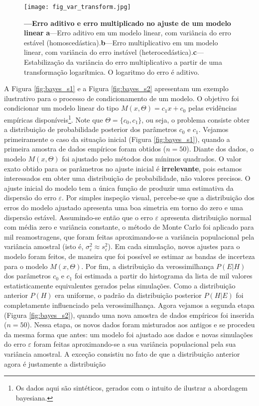 \documentclass[./main.tex]{subfiles}
\begin{document}
\begin{figure}[t!] %
	\centering				
	\texttt{[image: fig\_var\_transform.jpg]}		
	\caption[Erro aditivo e erro multiplicativo]
	{\textbf{---\;Erro aditivo e erro multiplicado no ajuste de um modelo linear}
        \;\textbf{a}\;---\;Erro aditivo em um modelo linear, com variância do erro estável (homoscedástica).\;\textbf{b}\;---\;Erro multiplicativo em um modelo linear, com variância do erro instável (heterocedástica).\;\textbf{c}\;---\;Estabilização da variância do erro multiplicativo a partir de uma transformação logarítmica. O logaritmo do erro é aditivo.
	}
\label{fig:var_transform}  %
\end{figure}
\par A Figura \ref{fig:bayes_s1} e a Figura \ref{fig:bayes_s2} apresentam um exemplo ilustrativo para o processo de condicionamento de um modelo. O objetivo foi condicionar um modelo linear do tipo $M(x, \Theta) = c_{1}x + c_{0}$ pelas evidências empíricas disponíveis\footnote{Os dados aqui são sintéticos, gerados com o intuito de ilustrar a abordagem bayesiana.}. Note que $\Theta=\{c_{0}, c_{1}\}$, ou seja, o problema consiste obter a distribuição de probabilidade posterior dos parâmetros $c_0$ e $c_1$. Vejamos primeiramente o caso da situação inicial (Figura \ref{fig:bayes_s1}), quando a primeira amostra de dados empíricos foram obtidos ($n=50$). Diante dos dados, o modelo $M(x, \Theta)$ foi ajustado pelo métodos dos mínimos quadrados. O valor exato obtido para os parâmetros no ajuste inicial é \textbf{irrelevante}, pois estamos interessados em obter uma distribuição de probabilidade, não valores precisos. O ajuste inicial do modelo tem a única função de produzir uma estimativa da dispersão do erro $\varepsilon$. Por simples inspeção visual, percebe-se que a distribuição dos erros do modelo ajustado apresenta uma boa simetria em torno do zero e uma dispersão estável. Assumindo-se então que o erro $\varepsilon$ apresenta distribuição normal com média zero e variância constante, o método de Monte Carlo foi aplicado para mil reamostragens, que foram feitas aproximando-se a variância populacional pela variância amostral (isto é, $\sigma^2_\varepsilon \approx s^2_\varepsilon$). Em cada simulação, novos ajustes para o modelo foram feitos, de maneira que foi possível se estimar as bandas de incerteza para o modelo $M(x, \Theta)$.  Por fim, a distribuição da verossimilhança $P(E | H)$ dos parâmetros $c_0$ e $c_1$ foi estimada a partir do histograma da lista de mil valores estatisticamente equivalentes gerados pelas simulações. Como a distribuição anterior $P(H)$ era uniforme, o padrão da distribuição posterior $P(H | E)$ foi completamente influenciado pela verossimilhança. Agora vejamos a segunda etapa (Figura \ref{fig:bayes_s2}), quando uma nova amostra de dados empíricos foi inserida ($n=50$). Nessa etapa, os novos dados foram misturados aos antigos e se procedeu da mesma forma que antes: um modelo foi ajustado aos dados e novas simulações do erro $\varepsilon$ foram feitas aproximando-se a sua variância populacional pela sua variância amostral. A exceção consistiu no fato de que a distribuição anterior agora é justamente a distribuição 
\end{document}
